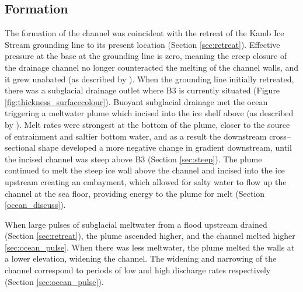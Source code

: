 \subsection{Formation}
The formation of the channel was coincident with the retreat of the Kamb Ice Stream grounding line to its present location (Section \ref{sec:retreat}). Effective pressure at the base at the grounding line is zero, meaning the creep closure of the drainage channel no longer counteracted the melting of the channel walls, and it grew unabated (as described by \cite{drews2015evolution}). 
When the grounding line initially retreated, there was a subglacial drainage outlet where B3 is currently situated (Figure \ref{fig:thickness_surfacecolour}). Buoyant subglacial drainage met the ocean triggering a meltwater plume which incised into the ice shelf above (as described by \cite{hewitt2020subglacial}). Melt rates were strongest at the bottom of the plume, closer to the source of entrainment and saltier bottom water, and as a result the downstream cross--sectional shape developed a more negative change in gradient downstream, until the incised channel was steep above B3 (Section \ref{sec:steep}). The plume continued to melt the steep ice wall above the channel and incised into the ice upstream creating an embayment, which allowed for salty water to flow up the channel at the sea floor, providing energy to the plume for melt (Section \ref{ocean_discuss}). 

When large pulses of subglacial meltwater from a flood upstream drained (Section \ref{sec:retreat}), the plume ascended higher, and the channel melted higher \ref{sec:ocean_pulse}. When there was less meltwater, the plume melted the walls at a lower elevation, widening the channel. The widening and narrowing of the channel correspond to periods of low and high discharge rates respectively (Section \ref{sec:ocean_pulse}).







